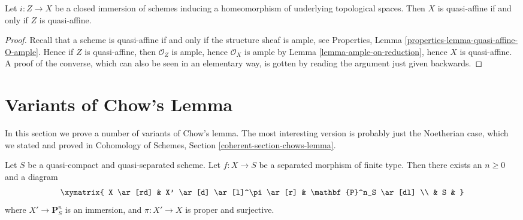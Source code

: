 \begin{lemma}
\label{lemma-thickening-quasi-affine}
Let $i : Z \to X$ be a closed immersion of schemes
inducing a homeomorphism of underlying topological spaces.
Then $X$ is quasi-affine if and only if $Z$ is quasi-affine.
\end{lemma}

\begin{proof}
Recall that a scheme is quasi-affine
if and only if the structure sheaf is ample, see
Properties, Lemma \ref{properties-lemma-quasi-affine-O-ample}.
Hence if $Z$ is quasi-affine, then $\mathcal{O}_Z$ is ample,
hence $\mathcal{O}_X$ is ample by
Lemma \ref{lemma-ample-on-reduction}, hence
$X$ is quasi-affine. A proof of the converse, which
can also be seen in an elementary way, is gotten by
reading the argument just given backwards.
\end{proof}




















\section{Variants of Chow's Lemma}
\label{section-chows-lemma}

\noindent
In this section we prove a number of variants of Chow's lemma.
The most interesting version is probably just the Noetherian
case, which we stated and proved in
Cohomology of Schemes, Section \ref{coherent-section-chows-lemma}.

\begin{lemma}
\label{lemma-chow-finite-type}
Let $S$ be a quasi-compact and quasi-separated scheme.
Let $f : X \to S$ be a separated morphism of finite type.
Then there exists an $n \geq 0$ and a diagram
$$
\xymatrix{
X \ar[rd] & X' \ar[d] \ar[l]^\pi \ar[r] & \mathbf{P}^n_S \ar[dl] \\
& S &
}
$$
where $X' \to \mathbf{P}^n_S$ is an immersion, and
$\pi : X' \to X$ is proper and surjective.
\end{lemma}


